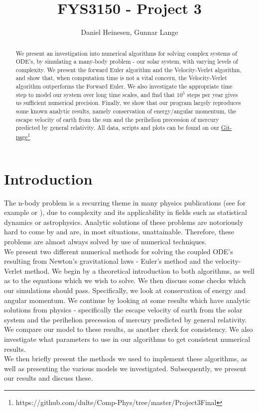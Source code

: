\documentclass[a4paper, 10pt]{article}
\title{FYS3150 - Project 3}
\author{Daniel Heinesen, Gunnar Lange}
\begin{document}
\maketitle
\begin{abstract}We present an investigation into numerical algorithms for solving complex systems of ODE's, by simulating a many-body problem - our solar system, with varying levels of complexity. We present the forward Euler algorithm and the Velocity-Verlet algorithm, and show that, when computation time is not a vital concern, the Velocity-Verlet algorithm outperforms the Forward Euler. We also investigate the appropriate time step to model our system over long time scales, and find that $10^5$ steps per year gives us sufficient numerical precision. Finally, we show that our program largely reproduces some known analytic results, namely conservation of energy/angular momentum, the escape velocity of earth from the sun and the perihelion precession of mercury predicted by general relativity. All data, scripts and plots can be found on our \href{https://github.com/dulte/Comp-Phys/tree/master/Project3Final}{Git-page}\footnote{https://github.com/dulte/Comp-Phys/tree/master/Project3Final}
\end{abstract}
\newpage
\tableofcontents
\newpage
\section{Introduction}
The n-body problem is a recurring theme in many physics publications (see for example \cite{PhysRevLett.19.1312} or \cite{Diacu2012} ), due to complexity and its applicability in fields such as statistical dynamics or astrophysics.  Analytic solutions of these problems are notoriously hard to come by and are, in most situations, unattainable. Therefore, these problems are almost always solved by use of numerical techniques.\\
\linebreak
We present two different numerical methods for solving the coupled ODE's resulting from Newton's gravitational laws - Euler's method and the velocity-Verlet method. We begin by a theoretical introduction to both algorithms, as well as to the equations which we wish to solve. We then discuss some checks which our simulations should pass. Specifically, we look at conservation of energy and angular momentum. We continue by looking at some results which have analytic solutions from physics - specifically the escape velocity of earth from the solar system and the perihelion precession of mercury predicted by general relativity. We compare our model to these results, as another check for consistency. We also investigate what parameters to use in our algorithms to get consistent numerical results.\\
\linebreak
We then briefly present the methods we used to implement these algorithms, as well as presenting the various models we investigated. Subsequently, we present our results and discuss these.
\end{document}
